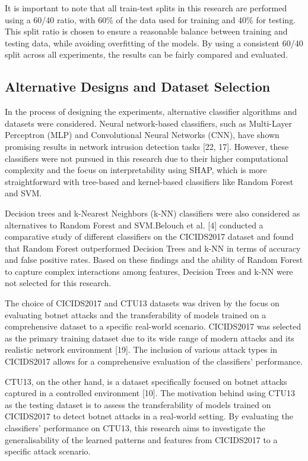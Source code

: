 It is important to note that all train-test splits in this research are performed using a 60/40 ratio, with 60\% of the data used for training and 40\% for testing. This split ratio is chosen to ensure a reasonable balance between training and testing data, while avoiding overfitting of the models. By using a consistent 60/40 split across all experiments, the results can be fairly compared and evaluated.

\subsection{Alternative Designs and Dataset Selection}
In the process of designing the experiments, alternative classifier algorithms and datasets were considered. Neural network-based classifiers, such as Multi-Layer Perceptron (MLP) and Convolutional Neural Networks (CNN), have shown promising results in network intrusion detection tasks [22, 17]. However, these classifiers were not pursued in this research due to their higher computational complexity and the focus on interpretability using SHAP, which is more straightforward with tree-based and kernel-based classifiers like Random Forest and SVM.\@

Decision trees and k-Nearest Neighbors (k-NN) classifiers were also considered as alternatives to Random Forest and SVM.\@ Belouch et al. [4] conducted a comparative study of different classifiers on the CICIDS2017 dataset and found that Random Forest outperformed Decision Trees and k-NN in terms of accuracy and false positive rates. Based on these findings and the ability of Random Forest to capture complex interactions among features, Decision Trees and k-NN were not selected for this research.

The choice of CICIDS2017 and CTU13 datasets was driven by the focus on evaluating botnet attacks and the transferability of models trained on a comprehensive dataset to a specific real-world scenario. CICIDS2017 was selected as the primary training dataset due to its wide range of modern attacks and its realistic network environment [19]. The inclusion of various attack types in CICIDS2017 allows for a comprehensive evaluation of the classifiers' performance.

CTU13, on the other hand, is a dataset specifically focused on botnet attacks captured in a controlled environment [10]. The motivation behind using CTU13 as the testing dataset is to assess the transferability of models trained on CICIDS2017 to detect botnet attacks in a real-world setting. By evaluating the classifiers' performance on CTU13, this research aims to investigate the generalisability of the learned patterns and features from CICIDS2017 to a specific attack scenario.

